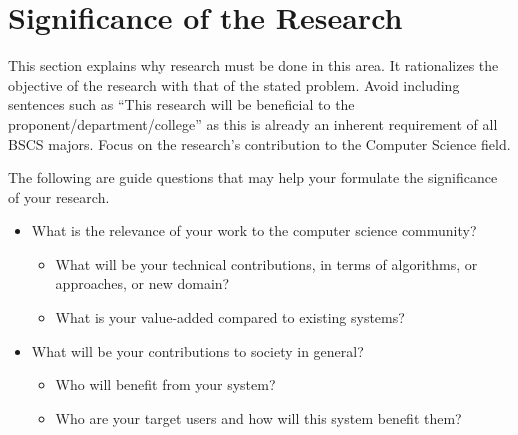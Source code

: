 \section{Significance of the Research}
\label{sec:significance}

This section explains why research must be done in this area.
 It rationalizes the objective of the research with that of the stated problem. 
 Avoid including sentences such as ``This research will be beneficial to the proponent/department/college'' as this is already an inherent requirement of all BSCS majors.  Focus on the research's contribution to the Computer Science field.

The following are guide questions that may help your formulate the significance of your research. 


%
%
\begin{itemize}
\item  What is the relevance of your work to the computer science community? 

\begin{itemize} 
\item What will be your technical contributions, in terms of algorithms, or approaches, or new domain? 
\item What is your value-added compared to existing systems? 
\end{itemize}

\item What will be your contributions to society in general? 
    \begin{itemize}
      \item Who will benefit from your system? 
      \item Who are your target users and how will this system benefit them? 
   \end{itemize}
\end{itemize}

\begin{comment}
If applicable, describe possible commercialization and/or innovation in your research.
\end{comment}


